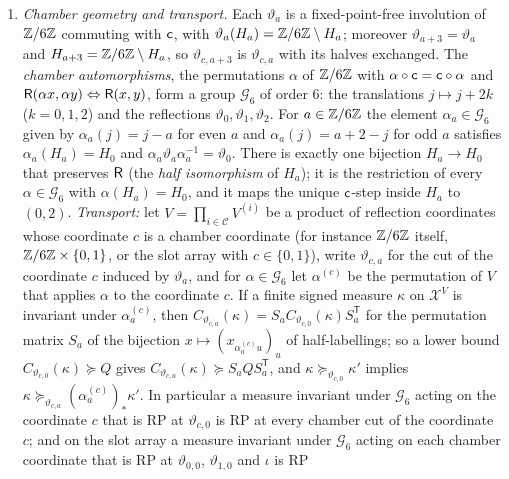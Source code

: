 \begin{lemma}\label{lem:slot-array}
\leavevmode
\begin{enumerate}[label=(\roman*)]
\item \emph{Chamber geometry and transport.} Each $\vartheta_a$ is a
 fixed-point-free involution of $\mathbb Z/6\mathbb Z$ commuting with $\mathsf c$, with
 $\vartheta_a(H_a)=\mathbb Z/6\mathbb Z\setminus H_a$; moreover $\vartheta_{a+3}=\vartheta_a$
 and $H_{a+3}=\mathbb Z/6\mathbb Z\setminus H_a$, so $\vartheta_{c,a+3}$ is $\vartheta_{c,a}$
 with its halves exchanged. The \emph{chamber automorphisms}, the
 permutations $\alpha$ of $\mathbb Z/6\mathbb Z$ with $\alpha\circ\mathsf c=\mathsf c\circ\alpha$ and
 $\mathsf R(\alpha x,\alpha y)\Leftrightarrow\mathsf R(x,y)$, form a group $\mathcal G_6$
 of order $6$: the translations $j\mapsto j+2k$ ($k=0,1,2$) and the
 reflections $\vartheta_0,\vartheta_1,\vartheta_2$. For $a\in\mathbb Z/6\mathbb Z$ the element
 $\alpha_a\in\mathcal G_6$ given by $\alpha_a(j)=j-a$ for even $a$ and
 $\alpha_a(j)=a+2-j$ for odd $a$ satisfies $\alpha_a(H_a)=H_0$ and
 $\alpha_a\vartheta_a\alpha_a^{-1}=\vartheta_0$. There is exactly one bijection
 $H_a\to H_0$ that preserves $\mathsf R$ (the \emph{half isomorphism} of $H_a$); it
 is the restriction of every $\alpha\in\mathcal G_6$ with $\alpha(H_a)=H_0$, and
 it maps the unique $\mathsf c$-step inside $H_a$ to $(0,2)$. \emph{Transport:} let
 $V=\prod_{i\in\mathcal C}V^{(i)}$ be a product of reflection coordinates whose
 coordinate $c$ is a chamber coordinate (for instance $\mathbb Z/6\mathbb Z$ itself,
 $\mathbb Z/6\mathbb Z\times\{0,1\}$, or the slot array with $c\in\{0,1\}$), write
 $\vartheta_{c,a}$ for the cut of the coordinate $c$ induced by $\vartheta_a$, and
 for $\alpha\in\mathcal G_6$ let $\alpha^{(c)}$ be the permutation of $V$ that
 applies $\alpha$ to the coordinate $c$. If a finite signed measure $\kappa$ on
 $\mathcal X^V$ is invariant under $\alpha_a^{(c)}$, then
 $C_{\vartheta_{c,a}}(\kappa)=S_aC_{\vartheta_{c,0}}(\kappa)S_a^{\mathsf T}$
 for the permutation matrix $S_a$ of the bijection
 $x\mapsto(x_{\alpha_a^{(c)}u})_u$ of half-labellings; so a lower bound
 $C_{\vartheta_{c,0}}(\kappa)\succeq Q$ gives
 $C_{\vartheta_{c,a}}(\kappa)\succeq S_aQS_a^{\mathsf T}$, and
 $\kappa\succeq_{\vartheta_{c,0}}\kappa'$ implies
 $\kappa\succeq_{\vartheta_{c,a}}(\alpha_a^{(c)})_*\kappa'$. In particular a
 measure invariant under $\mathcal G_6$ acting on the coordinate $c$ that is RP
 at $\vartheta_{c,0}$ is RP at every chamber cut of the coordinate $c$; and on
 the slot array a measure invariant under $\mathcal G_6$ acting on each chamber
 coordinate that is RP at $\vartheta_{0,0}$, $\vartheta_{1,0}$ and $\iota$ is RP

\end{enumerate}
\end{lemma}
